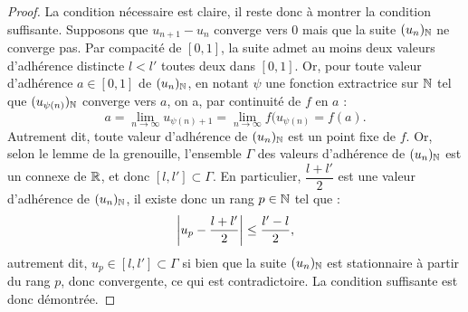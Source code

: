 \begin{proof}
La condition nécessaire est claire, il reste donc à montrer la condition suffisante. Supposons que $u_{n+1}-u_n$ converge vers 0
mais que la suite $(u_n)_\N$ ne converge pas. Par compacité de $[0,1]$, la suite admet au moins deux valeurs d'adhérence distincte
$l < l'$ toutes deux dans $[0,1]$. 
Or, pour toute valeur d'adhérence $a \in [0,1]$ de $(u_n)_\N$, en notant $\psi$ une fonction extractrice sur $\N$ 
tel que $(u_{\psi(n)})_\N$ converge vers $a$, on a, par continuité de $f$ en $a$ :
\[ a = \lim_{n \to \infty} u_{\psi(n)+1} = \lim_{n \to \infty} f(u_{\psi(n)} = f(a) . \]
Autrement dit, toute valeur d'adhérence de $(u_n)_\N$ est un point fixe de $f$. 
Or, selon le lemme de la grenouille, l'ensemble $\Gamma$ des valeurs d'adhérence de $(u_n)_\N$ est un connexe de $\R$, 
et donc $[l, l'] \subset \Gamma$.
En particulier, $\dfrac{l+l'}2$ est une valeur d'adhérence de $(u_n)_\N$, il existe donc un rang $p \in \N$ tel que :
\[ \abs*{u_p - \dfrac{l+l'}2} \leq \dfrac{l'-l}2 , \]
autrement dit, $u_p \in [l, l'] \subset \Gamma$ si bien que la suite $(u_n)_\N$ est stationnaire à partir du rang $p$, donc convergente,
ce qui est contradictoire. La condition suffisante est donc démontrée.
\end{proof}

